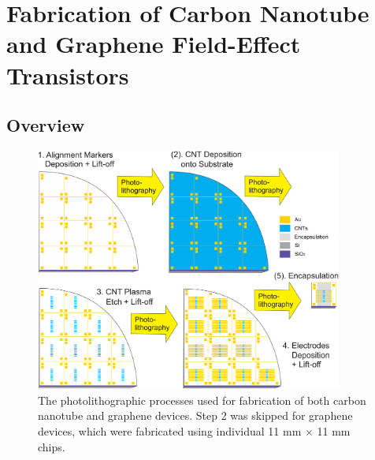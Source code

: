 \documentclass[
  a4paper,
]{scrbook}
\begin{document}
\hypertarget{sec-qw-processing}{%
\section{Fabrication of Carbon Nanotube and Graphene Field-Effect
Transistors}\label{sec-qw-processing}}

\hypertarget{overview}{%
\subsection{Overview}\label{overview}}

\begin{figure}

{\centering \includegraphics[width=0.9\textwidth,height=\textheight]{figures/ch4/photolithography-cycle.png}

}

\caption[The photolithographic processes used for fabrication of both
carbon nanotube and graphene
devices.]{\label{fig-qw-photolithography}The photolithographic processes
used for fabrication of both carbon nanotube and graphene devices. Step
2 was skipped for graphene devices, which were fabricated using
individual 11 mm \(\times\) 11 mm chips.}

\end{figure}
\end{document}
